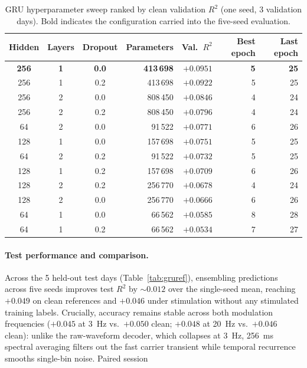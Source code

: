 \documentclass[11pt]{article}
\newcommand{\Rtwo}{R^{2}}
\begin{document}
\begin{table}[htbp]\centering
\caption{GRU hyperparameter sweep ranked by clean validation $R^2$ (one seed, 3 validation days). Bold indicates the configuration carried into the five-seed evaluation.}
\small
\begin{tabular}{@{}cccrrrr@{}}\toprule
Hidden & Layers & Dropout & Parameters & Val.\ $R^2$ & Best epoch & Last epoch \\ \midrule
\textbf{256} & \textbf{1} & \textbf{0.0} & \textbf{413\,698} & $\mathbf{+0.0951}$ & \textbf{5} & \textbf{25} \\
256 & 1 & 0.2 & 413\,698 & $+0.0922$ & 5 & 25 \\
256 & 2 & 0.0 & 808\,450 & $+0.0846$ & 4 & 24 \\
256 & 2 & 0.2 & 808\,450 & $+0.0796$ & 4 & 24 \\
64  & 2 & 0.0 & 91\,522  & $+0.0771$ & 6 & 26 \\
128 & 1 & 0.0 & 157\,698 & $+0.0751$ & 5 & 25 \\
64  & 2 & 0.2 & 91\,522  & $+0.0732$ & 5 & 25 \\
128 & 1 & 0.2 & 157\,698 & $+0.0709$ & 6 & 26 \\
128 & 2 & 0.2 & 256\,770 & $+0.0678$ & 4 & 24 \\
128 & 2 & 0.0 & 256\,770 & $+0.0666$ & 6 & 26 \\
64  & 1 & 0.0 & 66\,562  & $+0.0585$ & 8 & 28 \\
64  & 1 & 0.2 & 66\,562  & $+0.0534$ & 7 & 27 \\
\bottomrule\end{tabular}\label{tab:grusweep}
\end{table}

\paragraph{Test performance and comparison.}
Across the 5 held-out test days (Table~\ref{tab:gruref}), ensembling predictions across five seeds improves test $\Rtwo$ by ${\sim}0.012$ over the single-seed mean, reaching $+0.049$ on clean references and $+0.046$ under stimulation without any stimulated training labels. Crucially, accuracy remains stable across both modulation frequencies ($+0.045$ at 3~Hz vs.\ $+0.050$ clean; $+0.048$ at 20~Hz vs.\ $+0.046$ clean): unlike the raw-waveform decoder, which collapses at 3~Hz, 256~ms spectral averaging filters out the fast carrier transient while temporal recurrence smooths single-bin noise. Paired session
\end{document}

